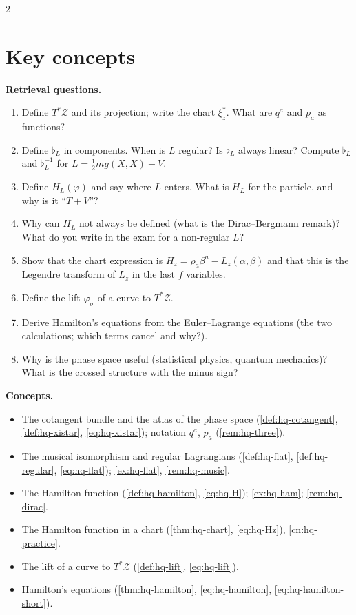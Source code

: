 \begin{paracol}{2}
\section*{Key concepts}
\begin{keyconcepts}
\textbf{Retrieval questions.}
\begin{enumerate}
  \item Define $T^*\mathcal Z$ and its projection; write the chart $\xi^*_z$. What are $q^a$ and $p_a$ as functions?
  \item Define $\flat_L$ in components. When is $L$ regular? Is $\flat_L$ always linear? Compute $\flat_L$ and $\flat_L^{-1}$ for $L=\tfrac12mg(X,X)-V$.
  \item Define $H_L(\varphi)$ and say where $L$ enters. What is $H_L$ for the particle, and why is it ``$T+V$''?
  \item Why can $H_L$ not always be defined (what is the Dirac--Bergmann remark)? What do you write in the exam for a non-regular $L$?
  \item Show that the chart expression is $H_z=\rho_a\beta^a-L_z(\alpha,\beta)$ and that this is the Legendre transform of $L_z$ in the last $f$ variables.
  \item Define the lift $\varphi_\sigma$ of a curve to $T^*\mathcal Z$.
  \item Derive Hamilton's equations from the Euler--Lagrange equations (the two calculations; which terms cancel and why?).
  \item Why is the phase space useful (statistical physics, quantum mechanics)? What is the crossed structure with the minus sign?
\end{enumerate}
\textbf{Concepts.}
\begin{itemize}
  \item The cotangent bundle and the atlas of the phase space (\cref{def:hq-cotangent}, \cref{def:hq-xistar}, \eqref{eq:hq-xistar}); notation $q^a$, $p_a$ (\cref{rem:hq-three}).
  \item The musical isomorphism and regular Lagrangians (\cref{def:hq-flat}, \cref{def:hq-regular}, \eqref{eq:hq-flat}); \cref{ex:hq-flat}, \cref{rem:hq-music}.
  \item The Hamilton function (\cref{def:hq-hamilton}, \eqref{eq:hq-H}); \cref{ex:hq-ham}; \cref{rem:hq-dirac}.
  \item The Hamilton function in a chart (\cref{thm:hq-chart}, \eqref{eq:hq-Hz}), \cref{cn:hq-practice}.
  \item The lift of a curve to $T^*\mathcal Z$ (\cref{def:hq-lift}, \eqref{eq:hq-lift}).
  \item Hamilton's equations (\cref{thm:hq-hamilton}, \eqref{eq:hq-hamilton}, \eqref{eq:hq-hamilton-short}).
\end{itemize}
\end{keyconcepts}

\flushside
\end{paracol}
